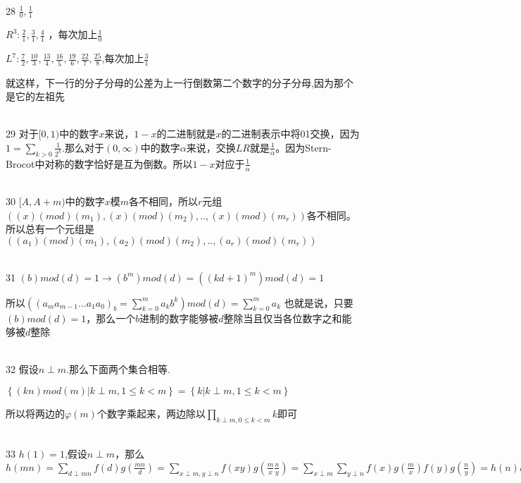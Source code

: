 \documentclass[onecolumn]{article}
\begin{document}
~\\
28 $\frac{1}{0},\frac{1}{1}$ \par
$R^{3}:\frac{2}{1},\frac{3}{1},\frac{4}{1}$ ，每次加上$\frac{1}{0}$ \par
$L^{7}:\frac{7}{2},\frac{10}{3},\frac{13}{4},\frac{16}{5},\frac{19}{6},\frac{22}{7},\frac{25}{8}$,每次加上$\frac{3}{1}$ \par
就这样，下一行的分子分母的公差为上一行倒数第二个数字的分子分母,因为那个是它的左祖先 \par
~\\
29 对于$[0,1)$中的数字$x$来说，$1-x$的二进制就是$x$的二进制表示中将01交换，因为$1=\sum_{k>0}\frac{1}{2^{k}}$.那么对于$(0,\infty )$$中的数字\alpha$来说，交换$LR$就是$\frac{1}{\alpha}$。因为Stern-Brocot中对称的数字恰好是互为倒数。所以$1-x$对应于$\frac{1}{\alpha}$\par
~\\
30 $[A,A+m)$中的数字$x$模$m$各不相同，所以$r$元组$((x)(mod)(m_{1}),(x)(mod)(m_{2}),..,(x)(mod)(m_{r}))$各不相同。所以总有一个元组是$((a_{1})(mod)(m_{1}),(a_{2})(mod)(m_{2}),..,(a_{r})(mod)(m_{r}))$ \par
~\\

31 $(b)mod(d)=1\rightarrow (b^{m})mod(d)=((kd+1)^{m})mod(d)=1$\par
所以$((a_{m}a_{m-1}...a_{1}a_{0})_{b}=\sum_{k=0}^{m}a_{k}b^{k})mod(d)=\sum_{k=0}^{m}a_{k}$ 也就是说，只要$(b)mod(d)=1$，那么一个$b$进制的数字能够被$d$整除当且仅当各位数字之和能够被$d$整除\par
~\\
32 假设$n\perp m$.那么下面两个集合相等. \par
$\left \{ (kn)mod(m)|k\perp m ,1\le k <m\right \}=\left \{ k|k\perp m ,1\le k <m \right \}$\par
所以将两边的$\varphi (m)$个数字乘起来，两边除以$\prod _{k\perp m ,0\le k <m}k$即可 \par
~\\
33 $h(1)=1$,假设$n\perp m$，那么$h(mn)=\sum_{d\perp mn}f(d)g(\frac{mn}{d})=\sum_{x\perp m,y\perp n}f(xy)g(\frac{m}{x}\frac{n}{y})=\sum_{x\perp m}\sum_{y\perp n}f(x)g(\frac{m}{x})f(y)g(\frac{n}{y})=h(n)h(m)$ \par
~\\
\end{document}

